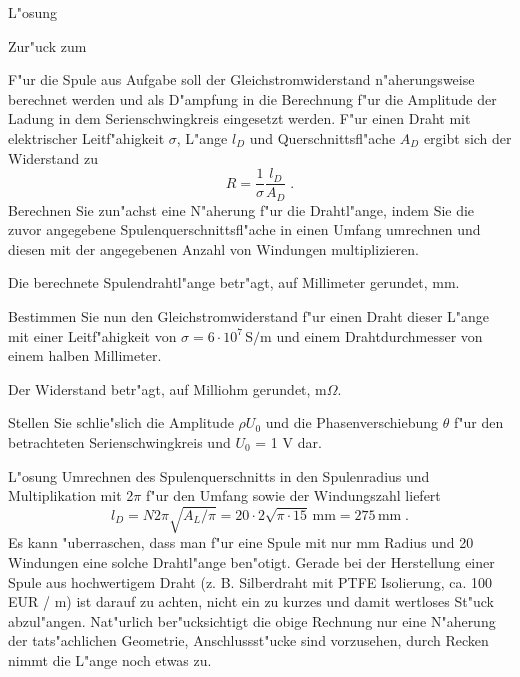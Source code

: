 \begin{MExercises}
\begin{MExercise}
\begin{MHint}{L"osung}
\end{MHint}

Zur"uck zum 
\end{MExercise}

\begin{MExercise}
F"ur die Spule aus Aufgabe  soll der Gleichstromwiderstand n"aherungsweise berechnet werden und als D"ampfung in die Berechnung f"ur die Amplitude der Ladung in dem Serienschwingkreis eingesetzt werden. F"ur einen Draht mit elektrischer Leitf"ahigkeit $\sigma$, L"ange $l_D$ und Querschnittsfl"ache $A_D$ ergibt sich der Widerstand zu
\begin{equation}
  R=\frac{1}{\sigma}\frac{l_D}{A_D}\; .
\end{equation}
Berechnen Sie zun"achst eine N"aherung f"ur die Drahtl"ange, indem Sie die zuvor angegebene Spulenquerschnittsfl"ache in einen Umfang umrechnen und diesen mit der angegebenen Anzahl von Windungen multiplizieren.

Die berechnete Spulendrahtl"ange betr"agt, auf Millimeter gerundet,  mm.

Bestimmen Sie nun den Gleichstromwiderstand f"ur einen Draht dieser L"ange mit einer Leitf"ahigkeit von $\sigma = 6\cdot 10^7\,\text{S/m}$ und einem Drahtdurchmesser von einem halben Millimeter.

Der Widerstand betr"agt, auf Milliohm gerundet,  m$\Omega$.

Stellen Sie schlie"slich die Amplitude $\rho U_0$ und die Phasenverschiebung $\theta$ f"ur den betrachteten Serienschwingkreis und $U_0$ = 1 V dar.

\begin{MHint}{L"osung} 
Umrechnen des Spulenquerschnitts in den Spulenradius und Multiplikation mit 2$\pi$ f"ur den Umfang sowie der Windungszahl liefert
\begin{equation}
  l_D=N 2\pi \sqrt{A_L/\pi} = 20\cdot 2 \sqrt{\pi\cdot 15}  \,\text{mm} = 275 \,\text{mm}\; .
\end{equation}
Es kann "uberraschen, dass man f"ur eine Spule mit nur  mm Radius und 20 Windungen eine solche Drahtl"ange ben"otigt. Gerade bei der Herstellung einer Spule aus hochwertigem Draht (z. B. Silberdraht mit PTFE Isolierung, ca. 100 EUR / m) ist darauf zu achten, nicht ein zu kurzes und damit wertloses St"uck abzul"angen. Nat"urlich ber"ucksichtigt die obige Rechnung nur eine N"aherung der tats"achlichen Geometrie, Anschlussst"ucke sind vorzusehen, durch Recken nimmt die L"ange noch etwas zu.


\end{MHint}
\end{MExercise}
\end{MExercises}
